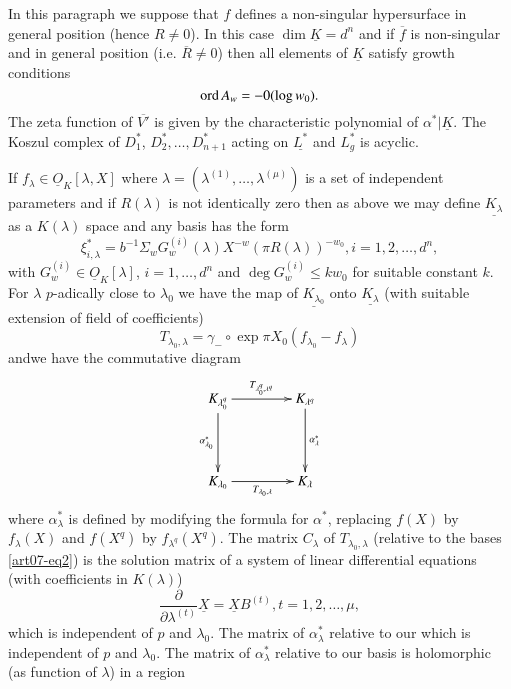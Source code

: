 In this paragraph we suppose that $f$ defines a non-singular hypersurface in general position (hence $R\neq 0$). In this case $\dim \underline{K}=d^{n}$ and if $\overline{f}$ is non-singular and in general position (i.e. $\overline{R}\neq 0$) then all elements of $\underline{K}$ satisfy growth conditions 
\begin{equation}
\operatorname{\mathrm{ord}} A_{w}=-0(\log w_{0}).\label{art07-eq1}
\end{equation}
The zeta function of $\overline{V'}$ is given by the characteristic polynomial of $\alpha^{*}|\underline{K}$. The Koszul complex of $D^{*}_{1}$, $D^{*}_{2},\ldots,D^{*}_{n+1}$ acting on $\underline{L^{*}}$ and $L^{*}_{g}$ is acyclic.

If $f_{\lambda}\in \underline{O}_{K}[\lambda,X]$ where $\lambda=(\lambda^{(1)},\ldots,\lambda^{(\mu)})$ is a set of independent parameters and if $R(\lambda)$ is not identically zero then as above we may define $\underline{K_{\lambda}}$ as a $K(\lambda)$ space and any basis has the form
\begin{equation}
\xi^{*}_{i,\lambda}=b^{-1}\Sigma_{w}G^{(i)}_{w}(\lambda)X^{-w}(\pi R(\lambda))^{-w_{0}}, i=1,2,\ldots,d^{n},\label{art07-eq2}
\end{equation}
with $G^{(i)}_{w}\in \underline{O}_{K}[\lambda]$, $i=1,\ldots,d^{n}$ and $\deg G^{(i)}_{w}\leq kw_{0}$ for suitable constant $k$. For $\lambda$ $p$-adically close to $\lambda_{0}$ we have the map of $\underline{K_{\lambda_{0}}}$ onto $\underline{K_{\lambda}}$ (with suitable extension of field of coefficients)
$$
T_{\lambda_{0},\lambda}=\gamma_{-}\circ \exp \pi X_{0}(f_{\lambda_{0}}-f_{\lambda})
$$
and\pageoriginale we have the commutative diagram
\[
\xymatrix@=1.5cm{
K_{\lambda^{q}_{0}}\ar[r]^-{T_{\lambda^{q}_{0},\lambda^{q}}}\ar[d]_-{\alpha^{*}_{\lambda_{0}}} & K_{\lambda^{q}}\ar[d]^-{\alpha^{*}_{\lambda}} \\
K_{\lambda_{0}}\ar[r]_-{T_{\lambda_{0},\lambda}} & K_{\lambda}
}
\]
where $\alpha^{*}_{\lambda}$ is defined by modifying the formula for $\alpha^{*}$, replacing $f(X)$ by $f_{\lambda}(X)$ and $f(X^{q})$ by $f_{\lambda^{q}}(X^{q})$. The matrix $C_{\lambda}$ of $T_{\lambda_{0},\lambda}$ (relative to the bases \eqref{art07-eq2}) is the solution matrix of a system of linear differential equations (with coefficients in $K(\lambda)$)
\begin{equation}
\dfrac{\partial}{\partial \lambda^{(t)}}\underline{X}=\underline{X}B^{(t)}, t=1,2,\ldots,\mu,\label{ART07-EQ3}
\end{equation}
which is independent of $p$ and $\lambda_{0}$. The matrix of $\alpha^{*}_{\lambda}$ relative to our which is independent of $p$ and $\lambda_{0}$. The matrix of $\alpha^{*}_{\lambda}$ relative to our basis is holomorphic (as function of $\lambda$) in a region
